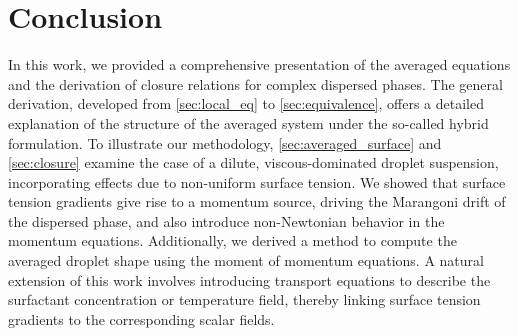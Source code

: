 \section{Conclusion}
\label{sec:conclusion}





In this work, we provided a comprehensive presentation of the averaged equations and the derivation of closure relations for complex dispersed phases. 
The general derivation, developed from \ref{sec:local_eq} to \ref{sec:equivalence}, offers a detailed explanation of the structure of the averaged system under the so-called hybrid formulation. 
To illustrate our methodology, \ref{sec:averaged_surface} and \ref{sec:closure} examine the case of a dilute, viscous-dominated droplet suspension, incorporating effects due to non-uniform surface tension. 
We showed that surface tension gradients give rise to a momentum source, driving the Marangoni drift of the dispersed phase, and also introduce non-Newtonian behavior in the momentum equations. 
Additionally, we derived a method to compute the averaged droplet shape using the moment of momentum equations. 
A natural extension of this work involves introducing transport equations to describe the surfactant concentration or temperature field, thereby linking surface tension gradients to the corresponding scalar fields.

